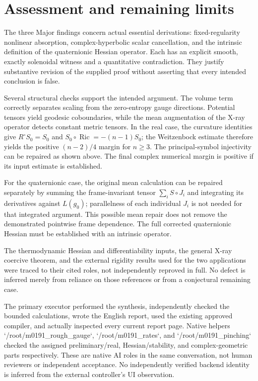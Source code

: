 \documentclass[10pt]{article}
\begin{document}
\section*{Assessment and remaining limits}
The three Major findings concern actual essential derivations: fixed-regularity nonlinear absorption, complex-hyperbolic scalar cancellation, and the intrinsic definition of the quaternionic Hessian operator. Each has an explicit smooth, exactly solenoidal witness and a quantitative contradiction. They justify substantive revision of the supplied proof without asserting that every intended conclusion is false.\par
Several structural checks support the intended argument. The volume term correctly separates scaling from the zero-entropy gauge directions. Potential tensors yield geodesic coboundaries, while the mean augmentation of the X-ray operator detects constant metric tensors. In the real case, the curvature identities give \(R^\circ S_0=S_0\) and \(S_0\circ\operatorname{Ric}=-(n-1)S_0\); the Weitzenbock estimate therefore yields the positive \((n-2)/4\) margin for \(n\ge3\). The principal-symbol injectivity can be repaired as shown above. The final complex numerical margin is positive if its input estimate is established.\par
For the quaternionic case, the original mean calculation can be repaired separately by summing the frame-invariant tensor \(\sum_i S\circ J_i\) and integrating its derivatives against \(L(g_0)\); parallelness of each individual \(J_i\) is not needed for that integrated argument. This possible mean repair does not remove the demonstrated pointwise frame dependence. The full corrected quaternionic Hessian must be established with an intrinsic operator.\par
The thermodynamic Hessian and differentiability inputs, the general X-ray coercive theorem, and the external rigidity results used for the two applications were traced to their cited roles, not independently reproved in full. No defect is inferred merely from reliance on those references or from a conjectural remaining case.\par
The primary executor performed the synthesis, independently checked the bounded calculations, wrote the English report, used the existing approved compiler, and actually inspected every current report page. Native helpers `/root/m0191\_rough\_gauge`, `/root/m0191\_rates`, and `/root/m0191\_pinching` checked the assigned preliminary/real, Hessian/stability, and complex-geometric parts respectively. These are native AI roles in the same conversation, not human reviewers or independent acceptance. No independently verified backend identity is inferred from the external controller’s UI observation.\par
\end{document}
